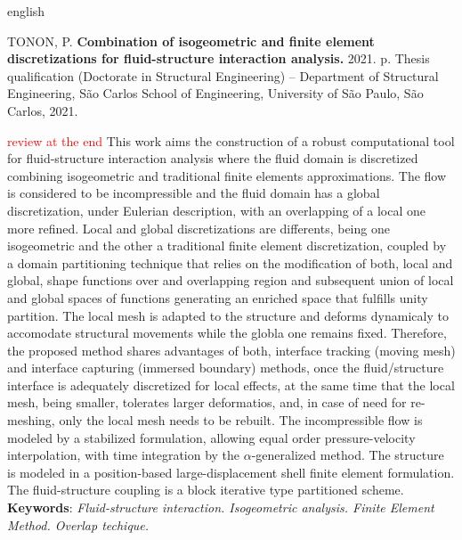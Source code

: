 \documentclass[
	12pt,		
	openright,
	twoside,	
	a4paper,			
	english,	
	french,		
	spanish,		
	brazil				
	]{abntex2}
\begin{document}
\begin{SingleSpace}
\begin{resumo}[Abstract]
	\begin{otherlanguage*}{english}		
		\begin{flushleft}
			TONON, P. \textbf{Combination of isogeometric and finite element discretizations for fluid-structure interaction analysis.} 2021. \pageref{LastPage} p. Thesis qualification (Doctorate in Structural Engineering) – Department of Structural Engineering, São Carlos School of Engineering, University of São Paulo, São Carlos, 2021. \newline 
		\end{flushleft}
			\textcolor{red}{review at the end}
		This work aims the construction of a robust computational tool for fluid-structure interaction analysis where the fluid domain is discretized combining isogeometric and traditional finite elements approximations. The flow is considered to be incompressible and the fluid domain has a global discretization, under Eulerian description, with an overlapping of a local one more refined. Local and global discretizations are differents, being one isogeometric and the other a traditional finite element discretization, coupled by a domain partitioning technique that relies on the modification of both, local and global, shape functions over and overlapping region and subsequent union of local and global spaces of functions generating an enriched space that fulfills unity partition. The local mesh is adapted to the structure and deforms dynamicaly to accomodate structural movements while the globla one remains fixed.
		Therefore, the proposed method shares advantages of both, interface tracking (moving mesh) and interface capturing (immersed boundary) methods, once the fluid/structure interface is adequately discretized for local effects, at the same time that the local mesh, being smaller, tolerates larger deformatios, and, in case of need for re-meshing, only the local mesh needs to be rebuilt. The incompressible flow is modeled by a stabilized formulation, allowing equal order pressure-velocity interpolation, with time integration by the $\alpha$-generalized method. The structure is modeled in a position-based large-displacement shell finite element formulation. The fluid-structure coupling is a block iterative type partitioned scheme. 
    	\newline \newline 
    	{\textbf{Keywords}: \textit{Fluid-structure interaction. Isogeometric analysis. Finite Element Method. Overlap techique. }}
	\end{otherlanguage*}
\end{resumo}
\end{SingleSpace}
\end{document}
